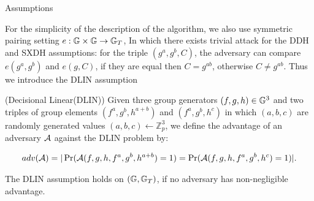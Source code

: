 \begin{subsection}{Assumptions}
  
  For the simplicity of the description of the algorithm, we also use symmetric pairing setting $e: \mathbb{G} \times \mathbb{G} \to \mathbb{G}_T$,
  In which there exists trivial attack for the DDH and SXDH assumptions: for the triple $(g^a, g^b, C)$, the adversary can compare $e(g^a, g^b)$ and $e(g, C)$, if they are equal then $C = g^{ab}$, otherwise $C \neq g^{ab}$.
  Thus we introduce the DLIN assumption
  \begin{myDef}{(Decisional Linear(DLIN))}
    Given three group generators $(f, g, h) \in \mathbb{G}^3$ and two triples of group elements $(f^a, g^b, h^{a+b})$ and $(f^a, g^b, h^c)$ in which $(a, b, c)$ are randomly generated values $(a, b, c) \gets \mathbb{Z}_p^3$, we define the advantage of an adversary $\mathcal{A}$ against the DLIN problem by:

    \begin{align*}
      adv(\mathcal{A}) = |\operatorname{Pr}(\mathcal{A}(f, g, h, f^a, g^b, h^{a+b}) = 1) = \operatorname{Pr}(\mathcal{A}(f, g, h, f^a, g^b, h^c) = 1)|.
    \end{align*}

    The DLIN assumption holds on $(\mathbb{G}, \mathbb{G}_T)$, if no adversary has non-negligible advantage.
  \end{myDef}


  

\end{subsection}




